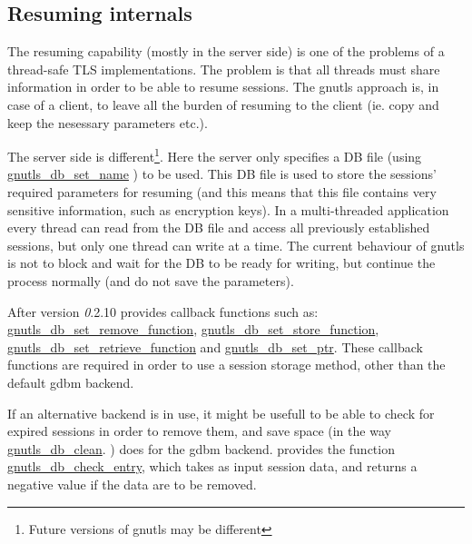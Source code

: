 \subsection{Resuming internals}
The resuming capability (mostly in the server side) is one of the problems of a thread-safe TLS
implementations. The problem is that all threads must share information in
order to be able to resume sessions. The gnutls approach is, in case of a
client, to leave all the burden of resuming to the client (ie. copy and keep the
nesessary parameters etc.).
\par
The server side is different\footnote{Future versions of gnutls may be
different}. 
Here the server only specifies a DB file (using 
\hyperref{gnutls\_db\_set\_name()}{gnutls\_db\_set\_name() (see Section }{ for more
information)}{gnutls_db_set_name}
) to be used. This DB file is used to store the sessions' required parameters for
resuming (and this means that this file contains very sensitive information,
such as encryption keys). In a multi-threaded application every thread can
read from the DB file and access all previously established sessions, but
only one thread can write at a time. The current behaviour of gnutls is
not to block and wait for the DB to be ready for writing, but continue the
process normally (and do not save the parameters).  
\par
 After version {\emph 0.2.10} \gnutls provides callback functions such as:
\hyperref{gnutls\_db\_set\_remove\_function()}{gnutls\_db\_set\_remove\_function() (see Section }{ for more
information)}{gnutls_db_set_remove_function},
\hyperref{gnutls\_db\_set\_store\_function()}{gnutls\_db\_set\_store\_function() (see Section }{ for more
information)}{gnutls_db_set_store_function},
\hyperref{gnutls\_db\_set\_retrieve\_function()}{gnutls\_db\_set\_retrieve\_function() (see Section }{ for more
information)}{gnutls_db_set_retrieve_function} and
\hyperref{gnutls\_db\_set\_ptr()}{gnutls\_db\_set\_ptr() (see Section }{ for more
information)}{gnutls_db_set_ptr}.
These callback functions are required in order to use a session
storage method, other than the default gdbm backend. 
\par
If an alternative backend is in use, it might be usefull to be able to check
for expired sessions in order to remove them, and save space (in the way 
\hyperref{gnutls\_db\_clean()}{gnutls\_db\_clean() (see Section }{ for more
information)}{gnutls_db_clean}.
) does for the gdbm backend. \gnutls provides the function
\hyperref{gnutls\_db\_check\_entry()}{gnutls\_db\_check\_entry() (see Section }{ for more
information)}{gnutls_db_check_entry}, which takes as input session data, and
returns a negative value if the data are to be removed.

